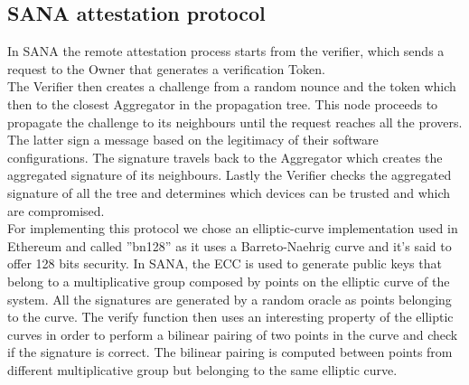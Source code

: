 \subsection{SANA attestation protocol}
In SANA the remote attestation process starts from the verifier, which sends a request to the Owner that generates a verification Token. \\
The Verifier then creates a challenge from a random nounce and the token which then to the closest Aggregator in the propagation tree.
This node proceeds to propagate the challenge to its neighbours until the request reaches all the provers.
The latter sign a message based on the legitimacy of their software configurations. 
The signature travels back to the Aggregator which creates the aggregated signature of its neighbours. 
Lastly the Verifier checks the aggregated signature of all the tree and determines which devices
can be trusted and which are compromised.\\
For implementing this protocol we chose an elliptic-curve implementation used in Ethereum and called ''bn128'' as it uses a Barreto-Naehrig curve and it's said to offer 128 bits security.
In SANA, the ECC is used to generate public keys that belong to a multiplicative
group composed by points on the elliptic curve of the system.
All the signatures are generated by a random oracle as points belonging to the curve. 
The verify function then uses an interesting property of the elliptic curves in order to perform a bilinear pairing of two points in the curve and check if the signature is correct.
The bilinear pairing is computed between points from different multiplicative group but belonging to the same elliptic curve.